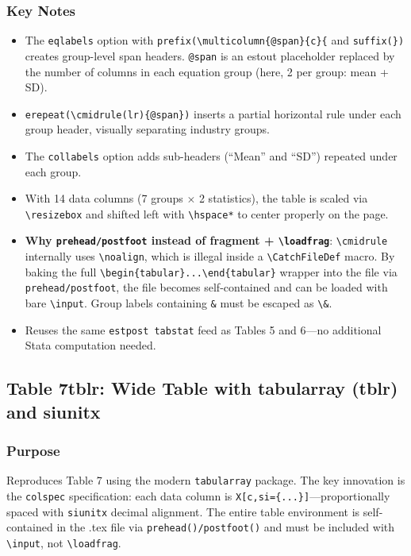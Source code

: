 \documentclass[11pt]{article}
\numberwithin{table}{section}
\begin{document}
\subsubsection{Key Notes}
\begin{itemize}
    \item The \texttt{eqlabels} option with \texttt{prefix(\textbackslash multicolumn\{@span\}\{c\}\{} and \texttt{suffix(\})} creates group-level span headers. \texttt{@span} is an estout placeholder replaced by the number of columns in each equation group (here, 2 per group: mean + SD).
    \item \texttt{erepeat(\textbackslash cmidrule(lr)\{@span\})} inserts a partial horizontal rule under each group header, visually separating industry groups.
    \item The \texttt{collabels} option adds sub-headers (``Mean'' and ``SD'') repeated under each group.
    \item With 14 data columns (7 groups $\times$ 2 statistics), the table is scaled via \texttt{\textbackslash resizebox} and shifted left with \texttt{\textbackslash hspace*} to center properly on the page.
    \item \textbf{Why \texttt{prehead/postfoot} instead of fragment + \texttt{\textbackslash loadfrag}}: \texttt{\textbackslash cmidrule} internally uses \texttt{\textbackslash noalign}, which is illegal inside a \texttt{\textbackslash CatchFileDef} macro. By baking the full \texttt{\textbackslash begin\{tabular\}...\textbackslash end\{tabular\}} wrapper into the file via \texttt{prehead/postfoot}, the file becomes self-contained and can be loaded with bare \texttt{\textbackslash input}. Group labels containing \texttt{\&} must be escaped as \texttt{\textbackslash\&}.
    \item Reuses the same \texttt{estpost tabstat} feed as Tables 5 and 6---no additional Stata computation needed.
\end{itemize}

\clearpage
\subsection{Table 7\textunderscore tblr: Wide Table with tabularray (tblr) and siunitx}
\subsubsection{Purpose}
Reproduces Table 7 using the modern \texttt{tabularray} package. The key innovation is the \texttt{colspec} specification: each data column is \texttt{X[c,si=\{...\}]}---proportionally spaced with \texttt{siunitx} decimal alignment. The entire table environment is self-contained in the .tex file via \texttt{prehead()/postfoot()} and must be included with \texttt{\textbackslash input}, not \texttt{\textbackslash loadfrag}.
\end{document}
